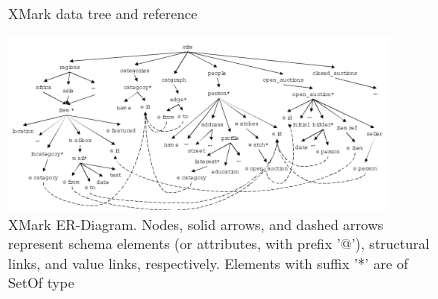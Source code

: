 \begin{figure}[h]

	\centering
	\\
	\centering
	\caption{XMark data tree and reference~\citep{xmark/original}}
	\label{fig:xmark-tree-reference}
\end{figure}


\begin{figure}[h]
	\centering
	\includegraphics[width=0.90\textwidth]{img/xmark-schema-4}
	\caption{XMark ER-Diagram. Nodes, solid arrows, and dashed arrows represent schema elements (or attributes, with prefix '@'), structural links, and value links, respectively. Elements with suffix '*' are of SetOf type\citep{xmark/schema-sumerize}}
	\label{fig:xmark-schema}
\end{figure}


